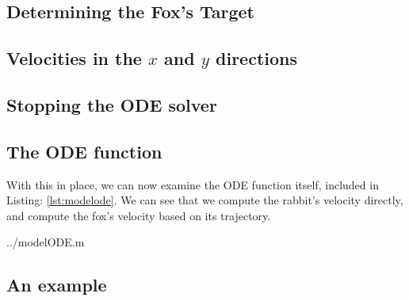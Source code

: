 \subsection {Determining the Fox's Target} \label{lbl:foxtarget}



\subsection {Velocities in the $x$ and $y$ directions}



\subsection {Stopping the ODE solver}



\subsection{The ODE function}

With this in place, we can now examine the ODE function itself, included in Listing: \ref{lst:modelode}. We can see that we compute the rabbit's velocity directly, and compute the fox's velocity based on its trajectory.

  {../modelODE.m}
 
 \subsection{An example}
 
 